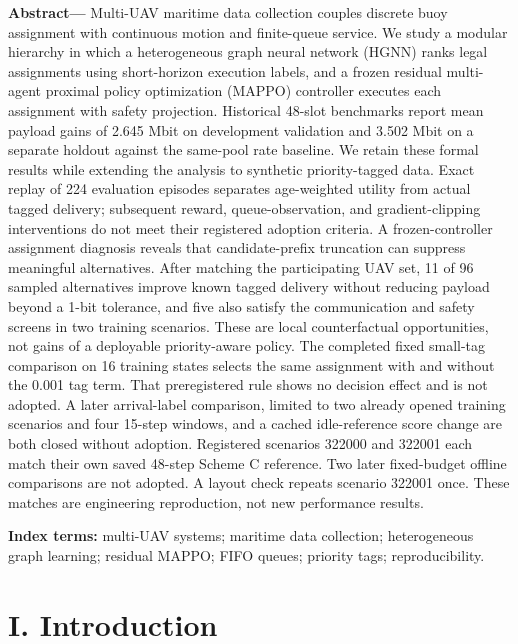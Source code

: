 
\noindent\textbf{Abstract---} Multi-UAV maritime data collection couples discrete buoy assignment with continuous motion and finite-queue service. We study a modular hierarchy in which a heterogeneous graph neural network (HGNN) ranks legal assignments using short-horizon execution labels, and a frozen residual multi-agent proximal policy optimization (MAPPO) controller executes each assignment with safety projection. Historical 48-slot benchmarks report mean payload gains of 2.645 Mbit on development validation and 3.502 Mbit on a separate holdout against the same-pool rate baseline. We retain these formal results while extending the analysis to synthetic priority-tagged data. Exact replay of 224 evaluation episodes separates age-weighted utility from actual tagged delivery; subsequent reward, queue-observation, and gradient-clipping interventions do not meet their registered adoption criteria. A frozen-controller assignment diagnosis reveals that candidate-prefix truncation can suppress meaningful alternatives. After matching the participating UAV set, 11 of 96 sampled alternatives improve known tagged delivery without reducing payload beyond a 1-bit tolerance, and five also satisfy the communication and safety screens in two training scenarios. These are local counterfactual opportunities, not gains of a deployable priority-aware policy. The completed fixed small-tag comparison on 16 training states selects the same assignment with and without the 0.001 tag term. That preregistered rule shows no decision effect and is not adopted. A later arrival-label comparison, limited to two already opened training scenarios and four 15-step windows, and a cached idle-reference score change are both closed without adoption. Registered scenarios 322000 and 322001 each match their own saved 48-step Scheme C reference. Two later fixed-budget offline comparisons are not adopted. A layout check repeats scenario 322001 once. These matches are engineering reproduction, not new performance results.

\textbf{Index terms:} multi-UAV systems; maritime data collection; heterogeneous graph learning; residual MAPPO; FIFO queues; priority tags; reproducibility.

\section*{I. Introduction}

